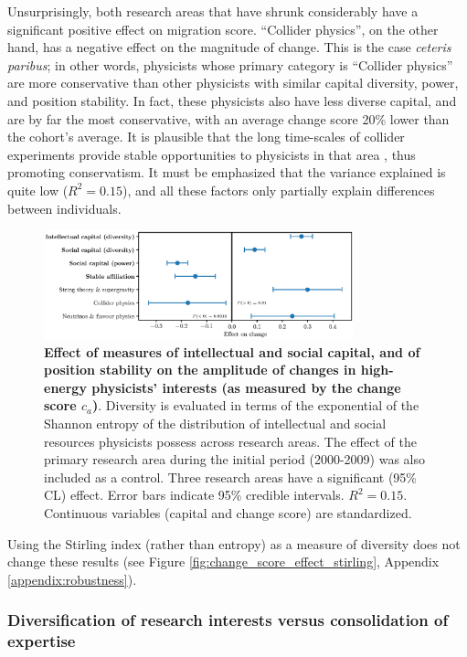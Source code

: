\documentclass{article}
\begin{document}
Unsurprisingly, both research areas that have shrunk considerably have a significant positive effect on migration score. ``Collider physics'', on the other hand, has a negative effect on the magnitude of change. This is the case \textit{ceteris paribus}; in other words, physicists whose primary category is ``Collider physics'' are more conservative than other physicists with similar capital diversity, power, and position stability. In fact, these physicists also have less diverse capital, and are by far the most conservative, with an average change score 20\% lower than the cohort's average. It is plausible that the long time-scales of collider experiments provide stable opportunities to physicists in that area \citep[p.~138]{galison1987how}, thus promoting conservatism. It must be emphasized that the variance explained is quite low ($R^2=0.15$), and all these factors only partially explain differences between individuals.

\begin{figure}[h]
    \centering
    \includegraphics[width=0.8\textwidth]{plots/change_score_effects_entropy_magnitude.eps}
    \caption{\textbf{Effect of measures of intellectual and social capital, and of position stability on the amplitude of changes in high-energy physicists' interests (as measured by the change score $c_a$)}. Diversity is evaluated in terms of the exponential of the Shannon entropy of the distribution of intellectual and social resources physicists possess across research areas. The effect of the primary research area during the initial period (2000-2009) was also included as a control. Three research areas have a significant (95\% CL) effect. Error bars indicate 95\% credible intervals. $R^2=0.15$. Continuous variables (capital and change score) are standardized.}
    \label{fig:change_score_effect}
\end{figure}

Using the Stirling index (rather than entropy) as a measure of diversity does not change these results (see Figure \ref{fig:change_score_effect_stirling}, Appendix \ref{appendix:robustness}).

\subsubsection{Diversification of research interests versus consolidation of expertise}
\end{document}

